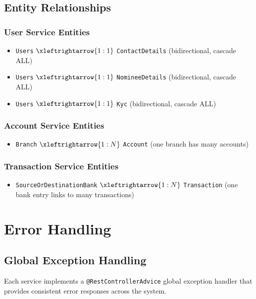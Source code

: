 \documentclass[12pt,a4paper]{report}
\begin{document}
\section{Entity Relationships}

\subsection{User Service Entities}
\begin{itemize}
    \item \texttt{Users} $\xleftrightarrow{1:1}$ \texttt{ContactDetails} (bidirectional, cascade ALL)
    \item \texttt{Users} $\xleftrightarrow{1:1}$ \texttt{NomineeDetails} (bidirectional, cascade ALL)
    \item \texttt{Users} $\xleftrightarrow{1:1}$ \texttt{Kyc} (bidirectional, cascade ALL)
\end{itemize}

\subsection{Account Service Entities}
\begin{itemize}
    \item \texttt{Branch} $\xleftrightarrow{1:N}$ \texttt{Account} (one branch has many accounts)
\end{itemize}

\subsection{Transaction Service Entities}
\begin{itemize}
    \item \texttt{SourceOrDestinationBank} $\xleftrightarrow{1:N}$ \texttt{Transaction} (one bank entry links to many transactions)
\end{itemize}

\chapter{Error Handling}

\section{Global Exception Handling}
Each service implements a \texttt{@RestControllerAdvice} global exception handler that provides consistent error responses across the system.
\end{document}

